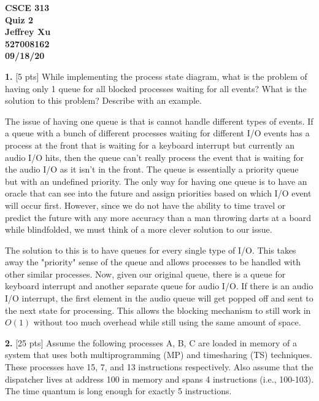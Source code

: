 \documentclass[12pt]{article}
\begin{document}
\begin{center}

{\bf
CSCE 313\\
Quiz 2\\
Jeffrey Xu\\
527008162\\
09/18/20\\
}

\end{center}

{\bf 1.} [5 pts] While implementing the process state diagram, what is the problem of having only 1 queue for all blocked processes waiting for all events? What is the solution to this problem? Describe with an example.

The issue of having one queue is that is cannot handle different types of events. If a queue with a bunch of different processes waiting for different I/O events has a process at the front that is waiting for a keyboard interrupt but currently an audio I/O hits, then the queue can't really process the event that is waiting for the audio I/O as it isn't in the front. The queue is essentially a priority queue but with an undefined priority. The only way for having one queue is to have an oracle that can see into the future and assign priorities based on which I/O event will occur first. However, since we do not have the ability to time travel or predict the future with any more accuracy than a man throwing darts at a board while blindfolded, we must think of a more clever solution to our issue. 

The solution to this is to have queues for every single type of I/O. This takes away the "priority" sense of the queue and allows processes to be handled with other similar processes. Now, given our original queue, there is a queue for keyboard interrupt and another separate queue for audio I/O. If there is an audio I/O interrupt, the first element in the audio queue will get popped off and sent to the next state for processing. This allows the blocking mechanism to still work in $O(1)$ without too much overhead while still using the same amount of space. 

{\bf 2.} [25 pts] Assume the following processes A, B, C are loaded in memory of a system that uses both multiprogramming (MP) and timesharing (TS) techniques. These processes have 15, 7, and 13 instructions respectively. Also assume that the dispatcher lives at address 100 in memory and spans 4 instructions (i.e., 100-103). The time quantum is long enough for exactly 5 instructions.
\end{document}
